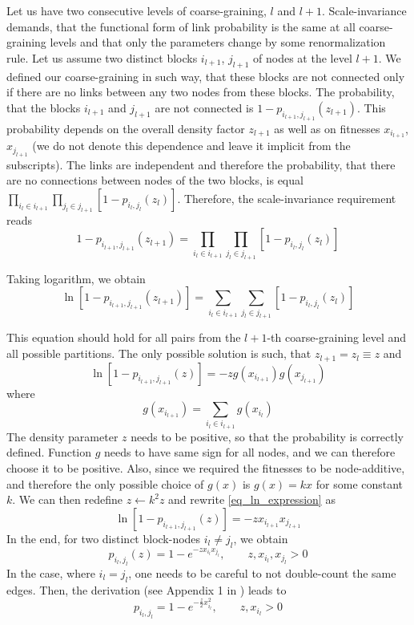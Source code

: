 Let us have two consecutive levels of coarse-graining, $l$ and $l+1$. Scale-invariance demands, that the functional form of link probability is the same at all coarse-graining levels and that only the parameters change by some renormalization rule. Let us assume two distinct blocks $i_{l+1}$, $j_{l+1}$ of nodes at the level $l+1$. We defined our coarse-graining in such way, that these blocks are not connected only if there are no links between any two nodes from these blocks. The probability, that the blocks $i_{l+1}$ and $j_{l+1}$ are not connected is $1 - p_{i_{l+1},j_{l+1}}(z_{l+1})$. This probability depends on the overall density factor $z_{l+1}$ as well as on fitnesses $x_{i_{l+1}}$, $x_{j_{l+1}}$ (we do not denote this dependence and leave it implicit from the subscripts). The links are independent and therefore the probability, that there are no connections between nodes of the two blocks, is equal $\prod_{i_l\in i_{l+1}}\prod_{j_l\in j_{l+1}}[1-p_{i_l,j_l}(z_l)]$. Therefore, the scale-invariance requirement reads
\begin{equation}
    1 - p_{i_{l+1},j_{l+1}}(z_{l+1}) = \prod_{i_l\in i_{l+1}}\prod_{j_l\in j_{l+1}}[1-p_{i_l,j_l}(z_l)]
\end{equation}

Taking logarithm, we obtain
\begin{equation}
    \ln [1 - p_{i_{l+1},j_{l+1}}(z_{l+1})] = \sum_{i_l\in i_{l+1}}\sum_{j_l\in j_{l+1}}[1-p_{i_l,j_l}(z_l)]
\end{equation}

This equation should hold for all pairs from the $l+1$-th coarse-graining level and all possible partitions. The only possible solution is such, that $z_{l+1} = z_l \equiv z$ and
\begin{equation}
     \ln [1 - p_{i_{l+1},j_{l+1}}(z)] = -zg(x_{i_{l+1}})g(x_{j_{l+1}})
     \label{eq_ln_expression}
\end{equation}
where
\begin{equation}
    g(x_{i_{l+1}}) = \sum_{i_l\in i_{l+1}}g(x_{i_l})
\end{equation}
The density parameter $z$ needs to be positive, so that the probability is correctly defined. Function $g$ needs to have same sign for all nodes, and we can therefore choose it to be positive. Also, since we required the fitnesses to be node-additive, and therefore the only possible choice of $g(x)$ is $g(x) = kx$ for some constant $k$. We can then redefine $z \leftarrow k^2 z$ and rewrite \ref{eq_ln_expression} as
\begin{equation}
    \ln [1 - p_{i_{l+1},j_{l+1}}(z)] = -zx_{i_{l+1}}x_{j_{l+1}}
\end{equation}
In the end, for two distinct block-nodes $i_l \neq j_l$, we obtain
\begin{equation}
    p_{i_l,j_l}(z) = 1 - e^{-zx_{i_l}x_{j_l}}, \qquad z, x_{i_l}, x_{j_l} > 0
\end{equation}
In the case, where $i_l = j_l$, one needs to be careful to not double-count the same edges. Then, the derivation (see Appendix 1 in \cite{Garuccio2023}) leads to
\begin{equation}
    p_{i_l,j_l} = 1 - e^{-\frac{z}{2}x_{i_l}^2}, \qquad z, x_{i_l} >0
\end{equation}

